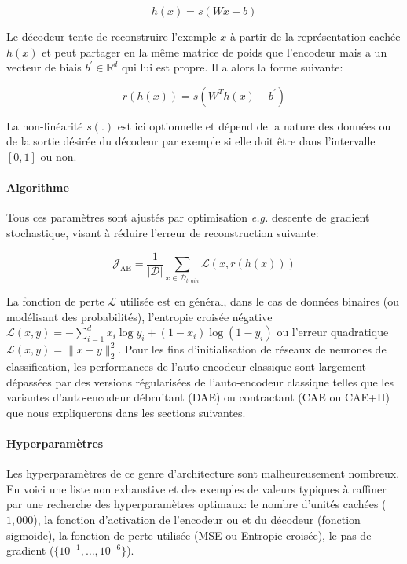 \begin{equation}
h(x)=s(Wx+b)
\end{equation}

Le décodeur tente de reconstruire l'exemple $x$ à partir de la représentation
cachée $h(x)$ et peut partager en la m\^eme matrice de poids que l'encodeur
mais a un vecteur de biais $b^{'}\in\mathbb{R}^d$ qui lui est propre. Il a
alors la forme suivante:

\begin{equation}
r(h(x))=s(W^{T} h(x)+b^{'}) \label{eq:autoenc}
\end{equation} 

La non-linéarité $s(.)$ est ici optionnelle et dépend de la nature des données
ou de la sortie désirée du décodeur par exemple si elle doit \^etre dans
l'intervalle $[0,1]$ ou non.  \\

\paragraph{Algorithme}
Tous ces paramètres sont ajustés par optimisation \textit{e.g.} descente de
gradient stochastique, visant à réduire l'erreur de reconstruction suivante:

\begin{equation}
\mathcal{J}_{\textrm{AE}} = \frac{1}{\vert \mathcal{D}\vert}\sum_{x\in\mathcal{D}_{train}}\mathcal{L}(x,r(h(x)))
\label{eq:ae}
\end{equation}

La fonction de perte $\mathcal{L}$ utilisée est en général, dans le cas de
données binaires (ou modélisant des probabilités), l'entropie croisée négative
$\mathcal{L}(x,y) = -\sum_{i=1}^d x_i\log y_i + (1-x_i)\log(1-y_i)$ ou l'erreur
quadratique $\mathcal{L}(x,y) = \| x-y\|^2_2$. Pour les fins d'initialisation
de réseaux de neurones de classification, les performances de l'auto-encodeur
classique sont largement dépassées par des versions régularisées de
l'auto-encodeur classique telles que les variantes d'auto-encodeur débruitant
(DAE) ou contractant (CAE ou CAE+H) que nous expliquerons dans les sections
suivantes.

\paragraph{Hyperparamètres} Les hyperparamètres de ce genre d'architecture sont
malheureusement nombreux. En voici une liste non exhaustive et des exemples de
valeurs typiques à raffiner par une recherche des hyperparamètres optimaux: le
nombre d'unités cachées ($1,000$), la fonction d'activation de l'encodeur ou et
du décodeur (fonction sigmoide), la fonction de perte utilisée (MSE ou Entropie
croisée), le pas de gradient ($\lbrace 10^{-1},\dots,10^{-6}\rbrace$).  \\

